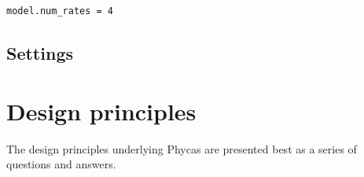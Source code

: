 \documentclass[10pt]{article}
\begin{document}
\begin{verbatim}
model.num_rates = 4
\end{verbatim}

\subsection{Settings}\label{subsec:phycassettings}


\section{Design principles}\label{sec:designprinciples}

The design principles underlying Phycas are presented best as a series of questions and answers.

\end{document}
